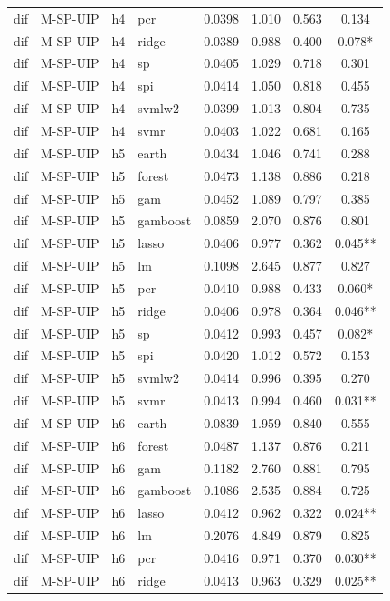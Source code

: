 \begin{ThreePartTable}
\begin{longtable}[t]{llclcccc}
dif & M-SP-UIP & h4 & pcr & 0.0398 & 1.010 & 0.563 & 0.134\\
dif & M-SP-UIP & h4 & ridge & 0.0389 & 0.988 & 0.400 & 0.078*\\
dif & M-SP-UIP & h4 & sp & 0.0405 & 1.029 & 0.718 & 0.301\\
dif & M-SP-UIP & h4 & spi & 0.0414 & 1.050 & 0.818 & 0.455\\
dif & M-SP-UIP & h4 & svmlw2 & 0.0399 & 1.013 & 0.804 & 0.735\\
dif & M-SP-UIP & h4 & svmr & 0.0403 & 1.022 & 0.681 & 0.165\\
\addlinespace
dif & M-SP-UIP & h5 & earth & 0.0434 & 1.046 & 0.741 & 0.288\\
dif & M-SP-UIP & h5 & forest & 0.0473 & 1.138 & 0.886 & 0.218\\
dif & M-SP-UIP & h5 & gam & 0.0452 & 1.089 & 0.797 & 0.385\\
dif & M-SP-UIP & h5 & gamboost & 0.0859 & 2.070 & 0.876 & 0.801\\
dif & M-SP-UIP & h5 & lasso & 0.0406 & 0.977 & 0.362 & 0.045**\\
dif & M-SP-UIP & h5 & lm & 0.1098 & 2.645 & 0.877 & 0.827\\
dif & M-SP-UIP & h5 & pcr & 0.0410 & 0.988 & 0.433 & 0.060*\\
dif & M-SP-UIP & h5 & ridge & 0.0406 & 0.978 & 0.364 & 0.046**\\
dif & M-SP-UIP & h5 & sp & 0.0412 & 0.993 & 0.457 & 0.082*\\
dif & M-SP-UIP & h5 & spi & 0.0420 & 1.012 & 0.572 & 0.153\\
dif & M-SP-UIP & h5 & svmlw2 & 0.0414 & 0.996 & 0.395 & 0.270\\
dif & M-SP-UIP & h5 & svmr & 0.0413 & 0.994 & 0.460 & 0.031**\\
\addlinespace
dif & M-SP-UIP & h6 & earth & 0.0839 & 1.959 & 0.840 & 0.555\\
dif & M-SP-UIP & h6 & forest & 0.0487 & 1.137 & 0.876 & 0.211\\
dif & M-SP-UIP & h6 & gam & 0.1182 & 2.760 & 0.881 & 0.795\\
dif & M-SP-UIP & h6 & gamboost & 0.1086 & 2.535 & 0.884 & 0.725\\
dif & M-SP-UIP & h6 & lasso & 0.0412 & 0.962 & 0.322 & 0.024**\\
dif & M-SP-UIP & h6 & lm & 0.2076 & 4.849 & 0.879 & 0.825\\
dif & M-SP-UIP & h6 & pcr & 0.0416 & 0.971 & 0.370 & 0.030**\\
dif & M-SP-UIP & h6 & ridge & 0.0413 & 0.963 & 0.329 & 0.025**\\

\end{longtable}
\end{ThreePartTable}
